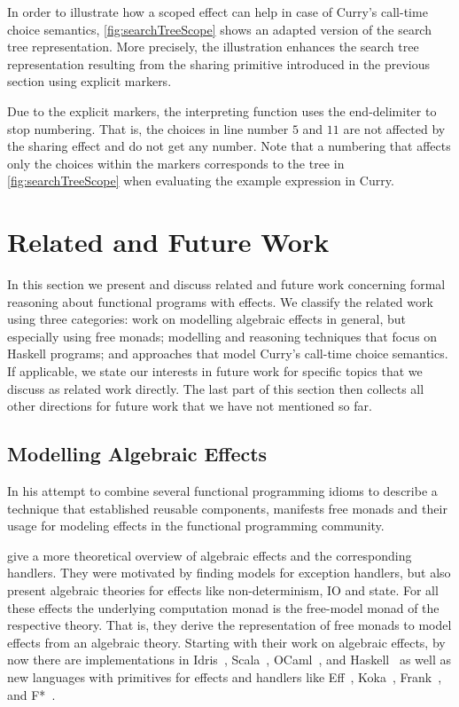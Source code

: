 In order to illustrate how a scoped effect can help in case of Curry's call-time choice semantics, \autoref{fig:searchTreeScope} shows an adapted version of the search tree representation.
More precisely, the illustration enhances the search tree representation resulting from the sharing primitive introduced in the previous section using explicit markers.

Due to the explicit markers, the interpreting function  uses the end-delimiter to stop numbering.
That is, the choices in line number $5$ and $11$ are not affected by the sharing effect and do not get any number.
Note that a numbering that affects only the choices within the markers corresponds to the tree in \autoref{fig:searchTreeScope} when evaluating the example expression in Curry.

\section{Related and Future Work}

In this section we present and discuss related and future work concerning formal reasoning about functional programs with effects.
We classify the related work using three categories: work on modelling algebraic effects in general, but especially using free monads; modelling and reasoning techniques that focus on Haskell programs; and approaches that model Curry's call-time choice semantics.
If applicable, we state our interests in future work for specific topics that we discuss as related work directly.
The last part of this section then collects all other directions for future work that we have not mentioned so far.

\subsection{Modelling Algebraic Effects}

In his attempt to combine several functional programming idioms to describe a technique that established reusable components, \citet{swierstra2008data} manifests free monads and their usage for modeling effects in the functional programming community.

\citet{plotkin2009handlers} give a more theoretical overview of algebraic effects and the corresponding handlers.
They were motivated by finding models for exception handlers, but also present algebraic theories for effects like non-determinism, IO and state.
For all these effects the underlying computation monad is the free-model monad of the respective theory.
That is, they derive the representation of free monads to model effects from an algebraic theory.
Starting with their work on algebraic effects, by now there are implementations in Idris~\citep{brady2013programming}, Scala~\citep{brachthauser2017effekt}, OCaml~\citep{kiselyov2018eff}, and Haskell~\citep{kiselyov2015freer,kammar2013handlers} as well as new languages with primitives for effects and handlers like Eff~\citep{pretnar2015introduction}, Koka~\citep{leijen2016algebraic}, Frank~\citep{lindley2017be}, and F*~\citep{swamy2016dependent}.

